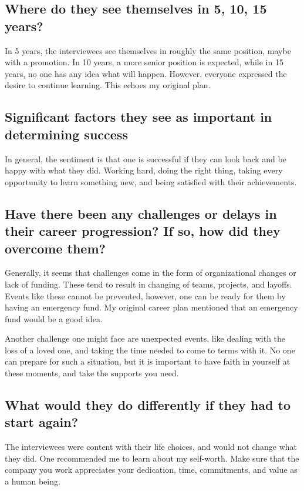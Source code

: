 \subsection{Where do they see themselves in 5, 10, 15 years?}
In 5 years, the interviewees see themselves in roughly the same position, maybe
with a promotion. In 10 years, a more senior position is expected, while in 15
years, no one has any idea what will happen.  However, everyone expressed the
desire to continue learning.  This echoes my original plan.

\subsection{Significant factors they see as important in determining success}
In general, the sentiment is that one is successful if they can look back and
be happy with what they did. Working hard, doing the right thing, taking every
opportunity to learn something new, and being satisfied with their
achievements.

\subsection{Have there been any challenges or delays in their career progression? If so, how did they overcome them?}
Generally, it seems that challenges come in the form of organizational changes
or lack of funding. These tend to result in changing of teams, projects, and
layoffs. Events like these cannot be prevented, however, one can be ready for
them by having an emergency fund. My original career plan mentioned that an
emergency fund would be a good idea.

Another challenge one might face are unexpected events, like dealing with the 
loss of a loved one, and taking the time needed to come to terms with it.
No one can prepare for such a situation, but it is important to
have faith in yourself at these moments, and take the supports you need. 

\subsection{What would they do differently if they had to start again?}
The interviewees were content with their life choices, and would not change
what they did. One recommended me to learn about my self-worth. Make sure that
the company you work appreciates your dedication, time, commitments, and value
as a human being. 


